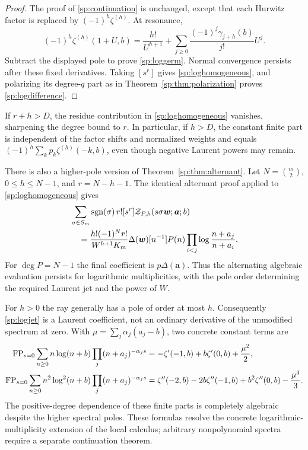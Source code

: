 \begin{proof}
The proof of \eqref{sp:continuation} is unchanged, except that each
Hurwitz factor is replaced by $(-1)^h\zeta^{(h)}$. At resonance,
\[
 (-1)^h\zeta^{(h)}(1+U,b)
  =\frac{h!}{U^{h+1}}
          +\sum_{j\ge0}\frac{(-1)^j\gamma_{j+h}(b)}{j!}U^j.
\]
Subtract the displayed pole to prove \eqref{sp:loggerm}. Normal
convergence persists after these fixed derivatives. Taking $[s^r]$
gives \eqref{sp:loghomogeneous}, and polarizing its degree-$q$ part
as in Theorem~\ref{sp:thm:polarization} proves
\eqref{sp:logdifference}.
\end{proof}

If $r+h>D$, the residue contribution in \eqref{sp:loghomogeneous}
vanishes, sharpening the degree bound to $r$. In particular, if $h>D$,
the constant finite part is independent of the factor shifts and
normalized weights and equals
$(-1)^h\sum_kp_k\zeta^{(h)}(-k,b)$, even though negative Laurent
powers may remain.

There is also a higher-pole version of Theorem~\ref{sp:thm:alternant}.
Let $N=\binom m2$, $0\le h\le N-1$, and $r=N-h-1$. The identical
alternant proof applied to \eqref{sp:loghomogeneous} gives
\begin{align}\label{sp:logalternant}
 &\sum_{\sigma\in S_m}\operatorname{sgn}(\sigma)\,
      r![s^r]\mathcal Z_{P,h}(s\sigma\boldsymbol w;\boldsymbol a;b)\notag\\
 &\quad=\frac{h!(-1)^N r!}{W^{h+1}K_m}\Delta(\boldsymbol w)
       [n^{-1}]P(n)\prod_{i<j}\log\frac{n+a_j}{n+a_i}.
\end{align}
For $\deg P=N-1$ the final coefficient is
$p\Delta(\boldsymbol a)$. Thus the alternating algebraic evaluation
persists for logarithmic multiplicities, with the pole order determining
the required Laurent jet and the power of $W$.

For $h>0$ the ray generally has a pole of order at most $h$.
Consequently \eqref{sp:logjet} is a Laurent coefficient, not an
ordinary derivative of the unmodified spectrum at zero. With
$\mu=\sum_j\alpha_j(a_j-b)$, two concrete constant terms are
\begin{align}
 \operatorname{FP}_{s=0}\sum_{n\ge0}n\log(n+b)\prod_j(n+a_j)^{-\alpha_js}
  &=-\zeta'(-1,b)+b\zeta'(0,b)+\frac{\mu^2}2,
 \label{sp:logexample1}\\
 \operatorname{FP}_{s=0}\sum_{n\ge0}n^2\log^2(n+b)\prod_j(n+a_j)^{-\alpha_js}
  &=\zeta''(-2,b)-2b\zeta''(-1,b)+b^2\zeta''(0,b)
       -\frac{\mu^3}3.
 \label{sp:logexample2}
\end{align}
The positive-degree dependence of these finite parts is completely
algebraic despite the higher spectral poles. These formulas resolve
the concrete logarithmic-multiplicity extension of the local calculus;
arbitrary nonpolynomial spectra require a separate continuation theorem.


